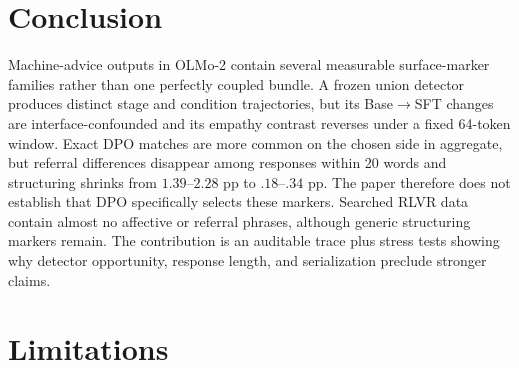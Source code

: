 \documentclass[11pt]{article}
\begin{document}
\section{Conclusion}
\label{sec:roadmap}

Machine-advice outputs in OLMo-2 contain several measurable surface-marker
families rather than one perfectly coupled bundle. A frozen union detector
produces distinct stage and condition trajectories, but its Base$\to$SFT changes
are interface-confounded and its empathy contrast reverses under a fixed
64-token window. Exact DPO matches are more common on the chosen side in
aggregate, but referral differences disappear among responses within 20 words
and structuring shrinks from $1.39$--$2.28$ pp to $.18$--$.34$ pp. The paper
therefore does not establish that DPO specifically selects these markers.
Searched RLVR data contain almost no affective or referral phrases, although
generic structuring markers remain. The contribution is an auditable trace plus
stress tests showing why detector opportunity, response length, and
serialization preclude stronger claims.

\section{Limitations}
\label{sec:limitations}
\end{document}
